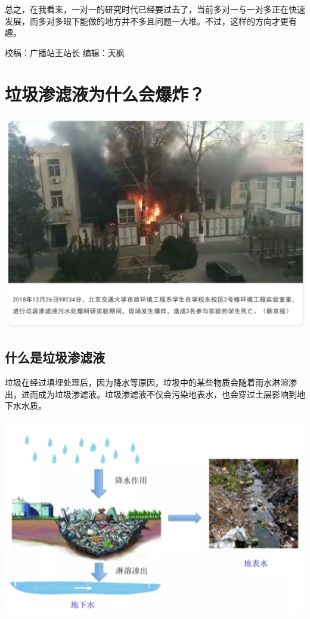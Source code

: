\documentclass[]{book}
\begin{document}
总之，在我看来，一对一的研究时代已经要过去了，当前多对一与一对多正在快速发展，而多对多眼下能做的地方并不多且问题一大堆。不过，这样的方向才更有趣。

校稿：广播站王站长
编辑：天枫

\hypertarget{ux5783ux573eux6e17ux6ee4ux6db2ux4e3aux4ec0ux4e48ux4f1aux7206ux70b8}{%
\section{垃圾渗滤液为什么会爆炸？}\label{ux5783ux573eux6e17ux6ee4ux6db2ux4e3aux4ec0ux4e48ux4f1aux7206ux70b8}}

\includegraphics[width=6.67in]{images/slybz1}

\hypertarget{ux4ec0ux4e48ux662fux5783ux573eux6e17ux6ee4ux6db2}{%
\subsection{什么是垃圾渗滤液}\label{ux4ec0ux4e48ux662fux5783ux573eux6e17ux6ee4ux6db2}}

垃圾在经过填埋处理后，因为降水等原因，垃圾中的某些物质会随着雨水淋溶渗出，进而成为垃圾渗滤液。垃圾渗滤液不仅会污染地表水，也会穿过土层影响到地下水水质。

\includegraphics[width=6.67in]{images/slybz2}
\end{document}
